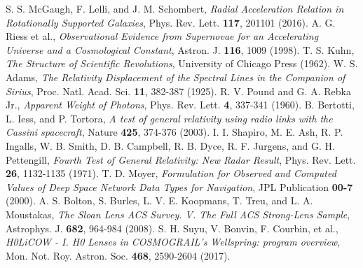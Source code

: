 \documentclass[12pt,a4paper]{article}
\begin{document}
\begin{thebibliography}{99}
		 S. S. McGaugh, F. Lelli, and J. M. Schombert, \textit{Radial Acceleration Relation in Rotationally Supported Galaxies}, Phys. Rev. Lett. \textbf{117}, 201101 (2016).
		 A. G. Riess et al., \textit{Observational Evidence from Supernovae for an Accelerating Universe and a Cosmological Constant}, Astron. J. \textbf{116}, 1009 (1998).
		 T. S. Kuhn, \textit{The Structure of Scientific Revolutions}, University of Chicago Press (1962).
		 W. S. Adams, \textit{The Relativity Displacement of the Spectral Lines in the Companion of Sirius}, Proc. Natl. Acad. Sci. \textbf{11}, 382-387 (1925).
		 R. V. Pound and G. A. Rebka Jr., \textit{Apparent Weight of Photons}, Phys. Rev. Lett. \textbf{4}, 337-341 (1960).
		 B. Bertotti, L. Iess, and P. Tortora, \textit{A test of general relativity using radio links with the Cassini spacecraft}, Nature \textbf{425}, 374-376 (2003).
		 I. I. Shapiro, M. E. Ash, R. P. Ingalls, W. B. Smith, D. B. Campbell, R. B. Dyce, R. F. Jurgens, and G. H. Pettengill, \textit{Fourth Test of General Relativity: New Radar Result}, Phys. Rev. Lett. \textbf{26}, 1132-1135 (1971).
		 T. D. Moyer, \textit{Formulation for Observed and Computed Values of Deep Space Network Data Types for Navigation}, JPL Publication \textbf{00-7} (2000).
		 A. S. Bolton, S. Burles, L. V. E. Koopmans, T. Treu, and L. A. Moustakas, \textit{The Sloan Lens ACS Survey. V. The Full ACS Strong-Lens Sample}, Astrophys. J. \textbf{682}, 964-984 (2008).
		 S. H. Suyu, V. Bonvin, F. Courbin, et al., \textit{H0LiCOW - I. H0 Lenses in COSMOGRAIL's Wellspring: program overview}, Mon. Not. Roy. Astron. Soc. \textbf{468}, 2590-2604 (2017).
	\end{thebibliography}
	
\end{document}
